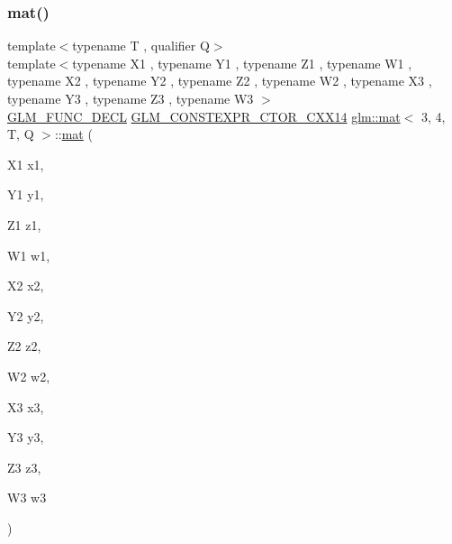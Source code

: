 \mbox{\label{structglm_1_1mat_3_013_00_014_00_01_t_00_01_q_01_4_a789aeb16a52b123e18e519b41ecfc4f3}} 
\subsubsection{\texorpdfstring{mat()}{mat()}\hspace{0.1cm}{\footnotesize\ttfamily [7/21]}}
{\footnotesize\ttfamily template$<$typename T , qualifier Q$>$ \\
template$<$typename X1 , typename Y1 , typename Z1 , typename W1 , typename X2 , typename Y2 , typename Z2 , typename W2 , typename X3 , typename Y3 , typename Z3 , typename W3 $>$ \\
\hyperlink{setup_8hpp_ab2d052de21a70539923e9bcbf6e83a51}{G\+L\+M\+\_\+\+F\+U\+N\+C\+\_\+\+D\+E\+CL} \hyperlink{setup_8hpp_a0900f9145e68bf6061b6f5e7be3fa751}{G\+L\+M\+\_\+\+C\+O\+N\+S\+T\+E\+X\+P\+R\+\_\+\+C\+T\+O\+R\+\_\+\+C\+X\+X14} \hyperlink{structglm_1_1mat}{glm\+::mat}$<$ 3, 4, T, Q $>$\+::\hyperlink{structglm_1_1mat}{mat} (\begin{DoxyParamCaption}\item[{X1}]{x1,  }\item[{Y1}]{y1,  }\item[{Z1}]{z1,  }\item[{W1}]{w1,  }\item[{X2}]{x2,  }\item[{Y2}]{y2,  }\item[{Z2}]{z2,  }\item[{W2}]{w2,  }\item[{X3}]{x3,  }\item[{Y3}]{y3,  }\item[{Z3}]{z3,  }\item[{W3}]{w3 }\end{DoxyParamCaption})}

\mbox{\label{structglm_1_1mat_3_013_00_014_00_01_t_00_01_q_01_4_a135092220b6453ee15896a05b01fcbd6}} 
